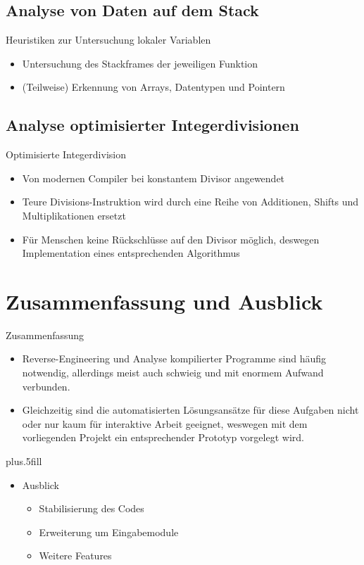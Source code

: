 \documentclass{beamer}
\begin{document}
\subsection{Analyse von Daten auf dem Stack}

\begin{frame}{Heuristiken zur Untersuchung lokaler Variablen}
  \begin{itemize}
  \item Untersuchung des Stackframes der jeweiligen Funktion
  \item (Teilweise) Erkennung von Arrays, Datentypen und Pointern
  \end{itemize}
\end{frame}

\subsection{Analyse optimisierter Integerdivisionen}

\begin{frame}{Optimisierte Integerdivision}
  \begin{itemize}
  \item Von modernen Compiler bei konstantem Divisor angewendet
  \item Teure Divisions-Instruktion wird durch eine Reihe von Additionen, Shifts und Multiplikationen ersetzt
  \item Für Menschen keine Rückschlüsse auf den Divisor möglich, deswegen Implementation eines entsprechenden Algorithmus
  \end{itemize}
\end{frame}

\section*{Zusammenfassung und Ausblick}

\begin{frame}{Zusammenfassung}

  \begin{itemize}
  \item Reverse-Engineering und Analyse kompilierter Programme sind häufig notwendig,
	allerdings meist auch schwieig und mit enormem Aufwand verbunden.
  \item Gleichzeitig sind die automatisierten Lösungsansätze für diese Aufgaben nicht
	oder nur kaum für interaktive Arbeit geeignet, weswegen mit dem vorliegenden
	Projekt ein entsprechender Prototyp vorgelegt wird.
  \end{itemize}
  
  \vskip0pt plus.5fill
  \begin{itemize}
  \item
    Ausblick
    \begin{itemize}
    \item Stabilisierung des Codes
    \item Erweiterung um Eingabemodule
    \item Weitere Features
    \end{itemize}
  \end{itemize}
\end{frame}
\end{document}
